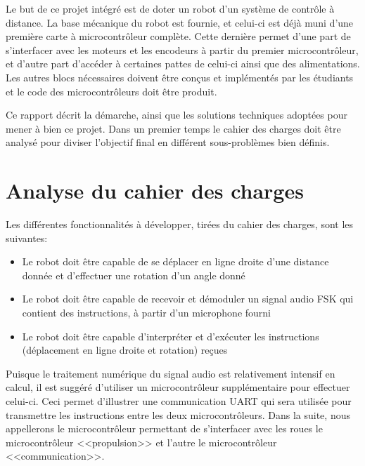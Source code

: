 Le but de ce projet intégré est de doter un robot d'un système de contrôle à distance. La base mécanique du robot est fournie, et celui-ci est déjà muni d'une première carte à microcontrôleur complète. Cette dernière permet d'une part de s'interfacer avec les moteurs et les encodeurs à partir du premier microcontrôleur, et d'autre part d'accéder à certaines pattes de celui-ci ainsi que des alimentations. Les autres blocs nécessaires doivent être conçus et implémentés par les étudiants et le code des microcontrôleurs doit être produit.

Ce rapport décrit la démarche, ainsi que les solutions techniques adoptées pour mener à bien ce projet. Dans un premier temps le cahier des charges doit être analysé pour diviser l'objectif final en différent sous-problèmes bien définis.

\section{Analyse du cahier des charges}
Les différentes fonctionnalités à développer, tirées du cahier des charges, sont les suivantes:
\begin{itemize}
  \item Le robot doit être capable de se déplacer en ligne droite d'une distance donnée et d'effectuer une rotation d'un angle donné
  \item Le robot doit être capable de recevoir et démoduler un signal audio FSK qui contient des instructions, à partir d'un microphone fourni
  \item Le robot doit être capable d’interpréter et d'exécuter les instructions (déplacement en ligne droite et rotation) reçues
\end{itemize}

Puisque le traitement numérique du signal audio est relativement intensif en calcul, il est suggéré d'utiliser un microcontrôleur supplémentaire pour effectuer celui-ci. Ceci permet d'illustrer une communication UART qui sera utilisée pour transmettre les instructions entre les deux microcontrôleurs. Dans la suite, nous appellerons le microcontrôleur permettant de s'interfacer avec les roues le microcontrôleur <<propulsion>> et l'autre le microcontrôleur <<communication>>.

